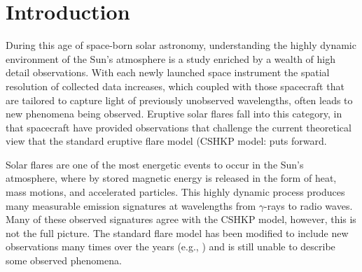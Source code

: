 




\section{Introduction}
During this age of space-born solar astronomy, understanding the highly dynamic environment of the Sun's atmosphere is a study enriched by a wealth of high detail observations. With each newly launched space instrument the spatial resolution of collected data increases, which coupled with those spacecraft that are tailored to capture light of previously unobserved wavelengths, often leads to new phenomena being observed. Eruptive solar flares fall into this category, in that spacecraft have provided observations that challenge the current theoretical view that the standard eruptive flare model (CSHKP model: \citep{1964NASSP..50..451C, 1966Natur.211..695S, 1974SoPh...34..323H, 1976SoPh...50...85K} puts forward.

Solar flares are one of the most energetic events to occur in the Sun's atmosphere, where by stored magnetic energy is released in the form of heat, mass motions, and accelerated particles. This highly dynamic process produces many measurable emission signatures at wavelengths from $\gamma$-rays to radio waves. Many of these observed signatures agree with the CSHKP model, however, this is not the full picture. The standard flare model has been modified to include new observations many times over the years (e.g., \cite{2011LRSP....8....6S}) and is still unable to describe some observed phenomena. 

